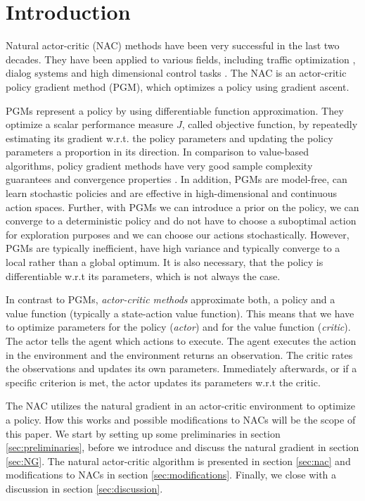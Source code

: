 \section{Introduction}
\label{sec:intro}

Natural actor-critic (NAC) methods \citep{peters2005natural} have been very successful in the last two decades. They have been applied to various fields, including traffic optimization \citep{richter2007natural}, dialog systems \citep{jurvcivcek2011natural} and high dimensional control tasks \citep{park2005rls, peters2008natural, peters2003reinforcement}. The NAC is an actor-critic policy gradient method (PGM), which optimizes a policy using gradient ascent.

PGMs represent a policy by using differentiable function approximation. They optimize a scalar performance measure $J$, called objective function, by repeatedly estimating its gradient w.r.t. the policy parameters and updating the policy parameters a proportion in its direction. In comparison to value-based algorithms, policy gradient methods have very good sample complexity guarantees and convergence properties \cite{nemirovski2005efficient}. In addition, PGMs are model-free, can learn stochastic policies and are effective in high-dimensional and continuous action spaces. Further, with PGMs we can introduce a prior on the policy, we can converge to a deterministic policy and do not have to choose a suboptimal action for exploration purposes and we can choose our actions stochastically. However, PGMs are typically inefficient, have high variance and typically converge to a local rather than a global optimum. It is also necessary, that the policy is differentiable w.r.t its parameters, which is not always the case.

In contrast to PGMs, \textit{actor-critic methods} approximate both, a policy and a value function (typically a state-action value function). This means that we have to optimize parameters for the policy (\textit{actor}) and for the value function (\textit{critic}). The actor tells the agent which actions to execute. The agent executes the action in the environment and the environment returns an observation. The critic rates the observations and updates its own parameters. Immediately afterwards, or if a specific criterion is met, the actor updates its parameters w.r.t the critic.

The NAC utilizes the natural gradient in an actor-critic environment to optimize a policy. How this works and possible modifications to NACs will be the scope of this paper. We start by setting up some preliminaries in section \ref{sec:preliminaries}, before we introduce and discuss the natural gradient in section \ref{sec:NG}. The natural actor-critic algorithm is presented in section \ref{sec:nac} and modifications to NACs in section \ref{sec:modifications}. Finally, we close with a discussion in section \ref{sec:discussion}.


